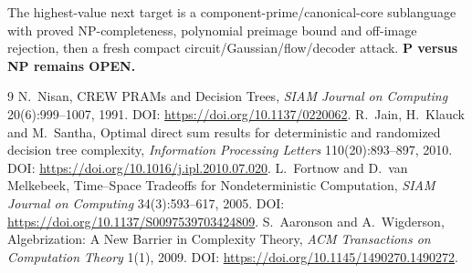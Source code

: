 \documentclass[11pt]{article}
\begin{document}
The highest-value next target is a component-prime/canonical-core sublanguage
with proved NP-completeness, polynomial preimage bound and off-image rejection,
then a fresh compact circuit/Gaussian/flow/decoder attack.
\textbf{P versus NP remains OPEN.}

\begin{thebibliography}{9}
N.~Nisan, CREW PRAMs and Decision Trees, \emph{SIAM Journal on Computing}
20(6):999--1007, 1991. DOI: \url{https://doi.org/10.1137/0220062}.
R.~Jain, H.~Klauck and M.~Santha, Optimal direct sum results for deterministic
and randomized decision tree complexity, \emph{Information Processing
Letters} 110(20):893--897, 2010. DOI:
\url{https://doi.org/10.1016/j.ipl.2010.07.020}.
L.~Fortnow and D.~van Melkebeek, Time--Space Tradeoffs for Nondeterministic
Computation, \emph{SIAM Journal on Computing} 34(3):593--617, 2005. DOI:
\url{https://doi.org/10.1137/S0097539703424809}.
S.~Aaronson and A.~Wigderson, Algebrization: A New Barrier in Complexity
Theory, \emph{ACM Transactions on Computation Theory} 1(1), 2009. DOI:
\url{https://doi.org/10.1145/1490270.1490272}.
\end{thebibliography}
\end{document}
